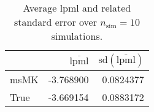 \begin{table}[H]

\caption{Average lpml and related standard error over $n_{\text{sim}} = 10$ simulations.}
\centering
\begin{tabular}[t]{lrr}
\toprule
  & $\overbar{\text{lpml}}$ & $\text{sd}(\overbar{\text{lpml}})$\\
\midrule
msMK & -3.768900 & 0.0824377\\
True & -3.669154 & 0.0883172\\
\bottomrule
\end{tabular}
\end{table}
